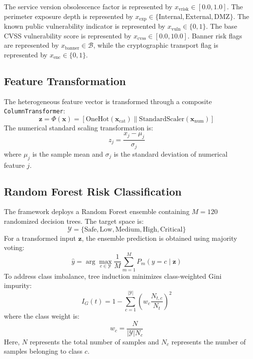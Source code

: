 \documentclass[conference]{IEEEtran}
\begin{document}
The service version obsolescence factor is represented by $x_{\text{vrisk}} \in [0.0, 1.0]$. The perimeter exposure depth is represented by $x_{\text{exp}} \in \{\text{Internal}, \text{External}, \text{DMZ}\}$. The known public vulnerability indicator is represented by $x_{\text{vuln}} \in \{0, 1\}$. The base CVSS vulnerability score is represented by $x_{\text{cvss}} \in [0.0, 10.0]$. Banner risk flags are represented by $x_{\text{banner}} \in \mathcal{B}$, while the cryptographic transport flag is represented by $x_{\text{enc}} \in \{0, 1\}$.

\subsection{Feature Transformation}
The heterogeneous feature vector is transformed through a composite \texttt{ColumnTransformer}:
\begin{equation}
\mathbf{z} = \Phi(\mathbf{x}) = [\text{OneHot}(\mathbf{x}_{\text{cat}}) \parallel \text{StandardScaler}(\mathbf{x}_{\text{num}})]
\end{equation}
The numerical standard scaling transformation is:
\begin{equation}
z_j = \frac{x_j - \mu_j}{\sigma_j}
\end{equation}
where $\mu_j$ is the sample mean and $\sigma_j$ is the standard deviation of numerical feature $j$.

\subsection{Random Forest Risk Classification}
The framework deploys a Random Forest ensemble containing $M = 120$ randomized decision trees. The target space is:
\begin{equation}
\mathcal{Y} = \{\text{Safe}, \text{Low}, \text{Medium}, \text{High}, \text{Critical}\}
\end{equation}
For a transformed input $\mathbf{z}$, the ensemble prediction is obtained using majority voting:
\begin{equation}
\hat{y} = \arg\max_{c \in \mathcal{Y}} \frac{1}{M} \sum_{m=1}^{M} P_m(y = c \mid \mathbf{z})
\end{equation}
To address class imbalance, tree induction minimizes class-weighted Gini impurity:
\begin{equation}
I_G(t) = 1 - \sum_{c=1}^{|\mathcal{Y}|} \left( w_c \frac{N_{t,c}}{N_t} \right)^2
\end{equation}
where the class weight is:
\begin{equation}
w_c = \frac{N}{|\mathcal{Y}| N_c}
\end{equation}
Here, $N$ represents the total number of samples and $N_c$ represents the number of samples belonging to class $c$.
\end{document}
